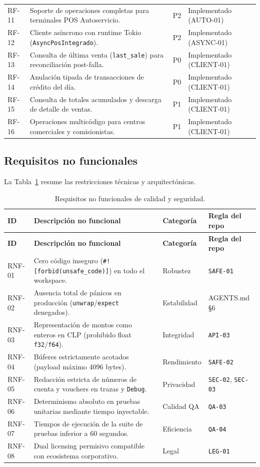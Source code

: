 \documentclass{../../plantilla/raysac-informe}
\begin{document}
\begin{longtable}{@{}p{1.4cm}p{7.2cm}p{2.2cm}p{3.4cm}@{}}
RF-11 & Soporte de operaciones completas para terminales POS Autoservicio. & P2 & Implementado (AUTO-01) \\
RF-12 & Cliente asíncrono con runtime Tokio (\texttt{AsyncPosIntegrado}). & P2 & Implementado (ASYNC-01) \\
RF-13 & Consulta de última venta (\texttt{last\_sale}) para reconciliación post-falla. & P0 & Implementado (CLIENT-01) \\
RF-14 & Anulación tipada de transacciones de crédito del día. & P0 & Implementado (CLIENT-01) \\
RF-15 & Consulta de totales acumulados y descarga de detalle de ventas. & P1 & Implementado (CLIENT-01) \\
RF-16 & Operaciones multicódigo para centros comerciales y comisionistas. & P1 & Implementado (CLIENT-01) \\
\end{longtable}

\subsection{Requisitos no funcionales}
La Tabla~\ref{tab:requisitos-no-funcionales} resume las restricciones técnicas y arquitectónicas.

\begin{longtable}{@{}p{1.6cm}p{7.4cm}p{2.2cm}p{3.0cm}@{}}
\caption{Requisitos no funcionales de calidad y seguridad.}\label{tab:requisitos-no-funcionales}\\
\toprule
\textbf{ID} & \textbf{Descripción no funcional} & \textbf{Categoría} & \textbf{Regla del repo} \\
\midrule
\endfirsthead
\toprule
\textbf{ID} & \textbf{Descripción no funcional} & \textbf{Categoría} & \textbf{Regla del repo} \\
\midrule
\endhead
\bottomrule
\endlastfoot
RNF-01 & Cero código inseguro (\texttt{\#![forbid(unsafe\_code)]}) en todo el workspace. & Robustez & \texttt{SAFE-01} \\
RNF-02 & Ausencia total de pánicos en producción (\texttt{unwrap}/\texttt{expect} denegados). & Estabilidad & AGENTS.md §6 \\
RNF-03 & Representación de montos como enteros en CLP (prohibido float \texttt{f32}/\texttt{f64}). & Integridad & \texttt{API-03} \\
RNF-04 & Búferes estrictamente acotados (payload máximo 4096 bytes). & Rendimiento & \texttt{SAFE-02} \\
RNF-05 & Redacción estricta de números de cuenta y vouchers en trazas y \texttt{Debug}. & Privacidad & \texttt{SEC-02}, \texttt{SEC-03} \\
RNF-06 & Determinismo absoluto en pruebas unitarias mediante tiempo inyectable. & Calidad QA & \texttt{QA-03} \\
RNF-07 & Tiempos de ejecución de la suite de pruebas inferior a 60 segundos. & Eficiencia & \texttt{QA-04} \\
RNF-08 & Dual licensing permisivo compatible con ecosistema corporativo. & Legal & \texttt{LEG-01} \\
\end{longtable}
\end{document}
